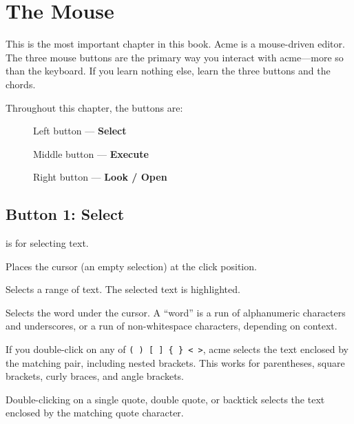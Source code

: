\chapter{The Mouse}
\label{ch:mouse}


This is the most important chapter in this book.  Acme is a
mouse-driven editor.  The three mouse buttons are the primary way you
interact with acme---more so than the keyboard.  If you learn nothing
else, learn the three buttons and the chords.

Throughout this chapter, the buttons are:

\begin{description}
\item[] Left button --- \textbf{Select}
\item[] Middle button --- \textbf{Execute}
\item[] Right button --- \textbf{Look / Open}
\end{description}

\section{Button 1: Select}
\label{sec:b1}


 is for selecting text.

\begin{description}[style=nextline]
\item[Click]
Places the cursor (an empty selection) at the click position.

\item[Drag]
Selects a range of text.  The selected text is highlighted.

\item[Double-click]
Selects the word under the cursor.  A ``word'' is a run of
alphanumeric characters and underscores, or a run of
non-whitespace characters, depending on context.

\item[Double-click on a bracket]
If you double-click on any of \texttt{( ) [ ] \{ \} < >}, acme
selects the text enclosed by the matching pair, including nested
brackets.  This works for parentheses, square brackets, curly
braces, and angle brackets.

\item[Double-click on a quote]
Double-clicking on a single quote, double quote, or backtick
selects the text enclosed by the matching quote character.
\end{description}

